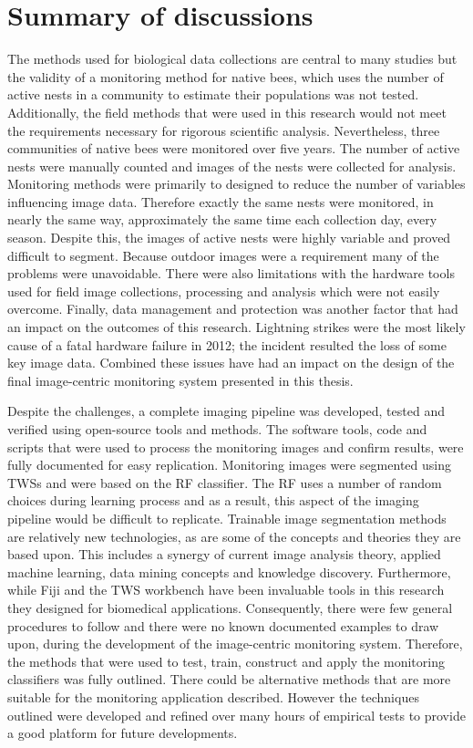 \clearpage

\section{Summary of discussions}
The methods used for biological data collections are central to many studies but the validity of a monitoring method for native bees, which uses the number of active nests in a community to estimate their populations was not tested. Additionally, the field methods that were used in this research would not meet the requirements necessary for rigorous scientific analysis. Nevertheless, three communities of native bees were monitored over five years. The number of active nests were manually counted and images of the nests were collected for analysis. Monitoring methods were primarily to designed to reduce the number of variables influencing image data. Therefore exactly the same nests were monitored, in nearly the same way, approximately the same time each collection day, every season. Despite this, the images of active nests were highly variable and proved difficult to segment. Because outdoor images were a requirement many of the problems were unavoidable. There were also limitations with the hardware tools used for field image collections, processing and analysis which were not easily overcome. Finally, data management and protection was another factor that had an impact on the outcomes of this research. Lightning strikes were the most likely cause of a fatal hardware failure in 2012; the incident resulted the loss of some key image data. Combined these issues have had an impact on the design of the final image-centric monitoring system presented in this thesis.

Despite the challenges, a complete imaging pipeline was developed, tested and verified using open-source tools and methods. The software tools, code and scripts that were used to process the monitoring images and confirm results, were fully documented for easy replication. Monitoring images were segmented using \acp{TWS} and were based on the \ac{RF} classifier. The \ac{RF} uses a number of random choices during learning process and as a result, this aspect of the imaging pipeline would be difficult to replicate. Trainable image segmentation methods are relatively new technologies, as are some of the concepts and theories they are based upon. This includes a synergy of current image analysis theory, applied machine learning, data mining concepts and knowledge discovery. Furthermore, while \ac{Fiji} and the \ac{TWS} workbench have been invaluable tools in this research they designed for biomedical applications. Consequently, there were few general procedures to follow and there were no known documented examples to draw upon, during the development of the image-centric monitoring system. Therefore, the methods that were used to test, train, construct and apply the monitoring classifiers was fully outlined. There could be alternative methods that are more suitable for the monitoring application described. However the techniques outlined were developed and refined over many hours of empirical tests to provide a good platform for future developments.


